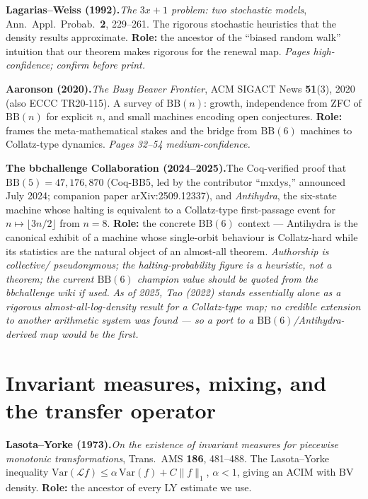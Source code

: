 \documentclass[11pt]{article}
\newcommand{\entry}[2]{\medskip\noindent\textbf{#1}\quad #2\par}
\begin{document}
\entry{Lagarias--Weiss (1992).}{\emph{The $3x+1$ problem: two stochastic
models}, Ann.\ Appl.\ Probab.\ \textbf{2}, 229--261. The rigorous stochastic
heuristics that the density results approximate. \textbf{Role:} the ancestor of
the ``biased random walk'' intuition that our theorem makes rigorous for the
renewal map. \emph{Pages high-confidence; confirm before print.}}

\entry{Aaronson (2020).}{\emph{The Busy Beaver Frontier}, ACM SIGACT News
\textbf{51}(3), 2020 (also ECCC TR20-115). A survey of $\mathrm{BB}(n)$: growth,
independence from ZFC of $\mathrm{BB}(n)$ for explicit $n$, and small machines
encoding open conjectures. \textbf{Role:} frames the meta-mathematical stakes
and the bridge from $\mathrm{BB}(6)$ machines to Collatz-type dynamics.
\emph{Pages 32--54 medium-confidence.}}

\entry{The bbchallenge Collaboration (2024--2025).}{The Coq-verified proof that
$\mathrm{BB}(5)=47{,}176{,}870$ (Coq-BB5, led by the contributor ``mxdys,''
announced July 2024; companion paper arXiv:2509.12337), and \emph{Antihydra},
the six-state machine whose halting is equivalent to a Collatz-type first-passage
event for $n\mapsto\lfloor3n/2\rfloor$ from $n=8$. \textbf{Role:} the concrete
$\mathrm{BB}(6)$ context --- Antihydra is the canonical exhibit of a machine
whose single-orbit behaviour is Collatz-hard while its statistics are the
natural object of an almost-all theorem. \emph{Authorship is collective/
pseudonymous; the halting-probability figure is a heuristic, not a theorem; the
current $\mathrm{BB}(6)$ champion value should be quoted from the bbchallenge
wiki if used.} \emph{As of 2025, Tao (2022) stands essentially alone as a
rigorous almost-all-log-density result for a Collatz-type map; no credible
extension to another arithmetic system was found --- so a port to a
$\mathrm{BB}(6)$/Antihydra-derived map would be the first.}}

\section{Invariant measures, mixing, and the transfer operator}

\entry{Lasota--Yorke (1973).}{\emph{On the existence of invariant measures for
piecewise monotonic transformations}, Trans.\ AMS \textbf{186}, 481--488. The
Lasota--Yorke inequality $\mathrm{Var}(\mathcal Lf)\le\alpha\,\mathrm{Var}(f)
+C\|f\|_1$, $\alpha<1$, giving an ACIM with BV density. \textbf{Role:}
the ancestor of every LY estimate we use.}
\end{document}
